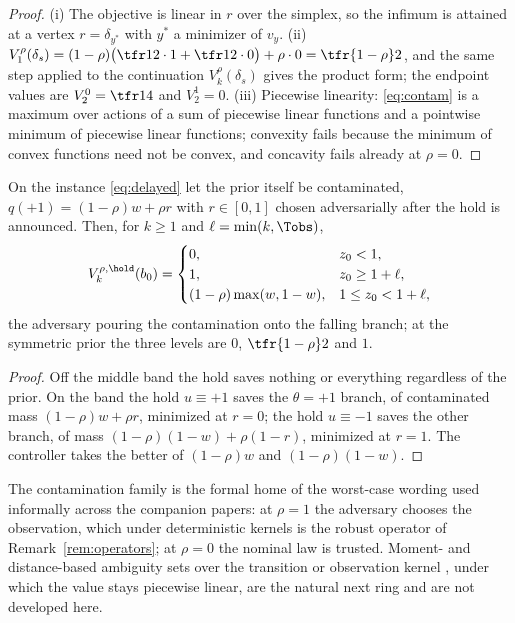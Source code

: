 \begin{proof}
(i) The objective is linear in $r$ over the simplex, so the infimum is attained at a vertex $r=\delta_{y^{*}}$ with $y^{*}$ a minimizer of $v_y$. (ii) $V^{\rho}_1(\delta_s)=(1-\rho)\bigl(\tfr12\cdot1+\tfr12\cdot0\bigr)+\rho\cdot0=\tfr{1-\rho}2$, and the same step applied to the continuation $V^{\rho}_{k}(\delta_s)$ gives the product form; the endpoint values are $V^{0}_2=\tfr14$ and $V^{1}_2=0$. (iii) Piecewise linearity: \eqref{eq:contam} is a maximum over actions of a sum of piecewise linear functions and a pointwise minimum of piecewise linear functions; convexity fails because the minimum of convex functions need not be convex, and concavity fails already at $\rho=0$.
\end{proof}

\begin{proposition}\label{prop:priorcontam}
On the instance \eqref{eq:delayed} let the prior itself be contaminated, $q(+1)=(1-\rho)w+\rho r$ with $r\in[0,1]$ chosen adversarially after the hold is announced. Then, for $k\ge1$ and $\ell=\min(k,\Tobs)$,
\begin{equation}\label{eq:priorcontam}
V^{\rho,\hold}_k(b_0)=\begin{cases}0,&z_0<1,\\ 1,&z_0\ge1+\ell,\\ (1-\rho)\max(w,1-w),&1\le z_0<1+\ell,\end{cases}
\end{equation}
the adversary pouring the contamination onto the falling branch; at the symmetric prior the three levels are $0$, $\tfr{1-\rho}2$ and $1$.
\end{proposition}

\begin{proof}
Off the middle band the hold saves nothing or everything regardless of the prior. On the band the hold $u\equiv+1$ saves the $\theta=+1$ branch, of contaminated mass $(1-\rho)w+\rho r$, minimized at $r=0$; the hold $u\equiv-1$ saves the other branch, of mass $(1-\rho)(1-w)+\rho(1-r)$, minimized at $r=1$. The controller takes the better of $(1-\rho)w$ and $(1-\rho)(1-w)$.
\end{proof}

The contamination family is the formal home of the worst-case wording used informally across the companion papers: at $\rho=1$ the adversary chooses the observation, which under deterministic kernels is the robust operator of Remark~\ref{rem:operators}; at $\rho=0$ the nominal law is trusted. Moment- and distance-based ambiguity sets over the transition or observation kernel \cite{Osogami2015,Nakao2021,Saghafian2018}, under which the value stays piecewise linear, are the natural next ring and are not developed here.
